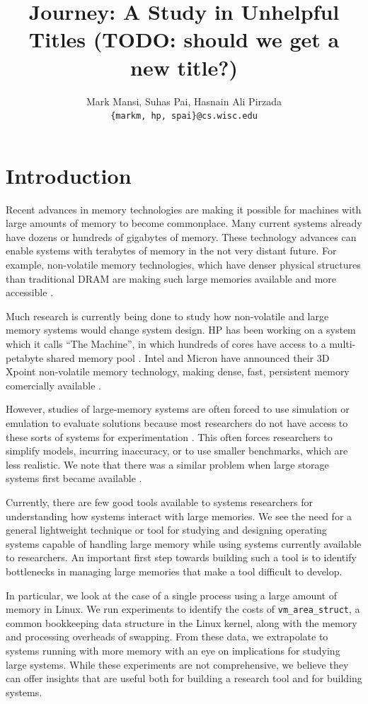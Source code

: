 \documentclass[twocolumn,11pt]{article}
\title{Journey: A Study in Unhelpful Titles (TODO: should we get a new title?)}
\author{Mark Mansi, Suhas Pai, Hasnain Ali Pirzada\\\texttt{\{markm, hp, spai\}@cs.wisc.edu}}
\date{}
\begin{document}
\maketitle

\section{Introduction}

Recent advances in memory technologies are making it possible for machines with
large amounts of memory to become commonplace. Many current systems already
have dozens or hundreds of gigabytes of memory. These technology advances can
enable systems with terabytes of memory in the not very distant future. For
example, non-volatile memory technologies, which have denser physical
structures than traditional DRAM are making such large memories available and
more accessible \cite{xpoint}.

Much research is currently being done to study how non-volatile and large
memory systems would change system design. HP has been working on a system
which it calls ``The Machine'', in which hundreds of cores have access to a
multi-petabyte shared memory pool \cite{hp_machine}. Intel and
Micron have announced their 3D Xpoint non-volatile memory technology, making
dense, fast, persistent memory comercially available \cite{xpoint}.

However, studies of large-memory systems are often forced to use simulation or
emulation to evaluate solutions because most researchers do not have access to
these sorts of systems for experimentation \cite{quartz}. This often
forces researchers to simplify models, incurring inaccuracy, or to use smaller
benchmarks, which are less realistic. We note that there was a similar problem
when large storage systems first became available \cite{david, exalt}.

Currently, there are few good tools available to systems researchers for
understanding how systems interact with large memories. We see the need for a
general lightweight technique or tool for studying and designing operating
systems capable of handling large memory while using systems currently
available to researchers.  An important first step towards building such a tool
is to identify bottlenecks in managing large memories that make a tool
difficult to develop. 

In particular, we look at the case of a single process using a large amount of
memory in Linux. We run experiments to identify the costs of
\texttt{vm\_area\_struct}, a common bookkeeping data structure in the Linux
kernel, along with the memory and processing overheads of swapping. From these
data, we extrapolate to systems running with more memory with an eye on
implications for studying large systems. While these experiments are not
comprehensive, we believe they can offer insights that are useful both for
building a research tool and for building systems.
\end{document}

